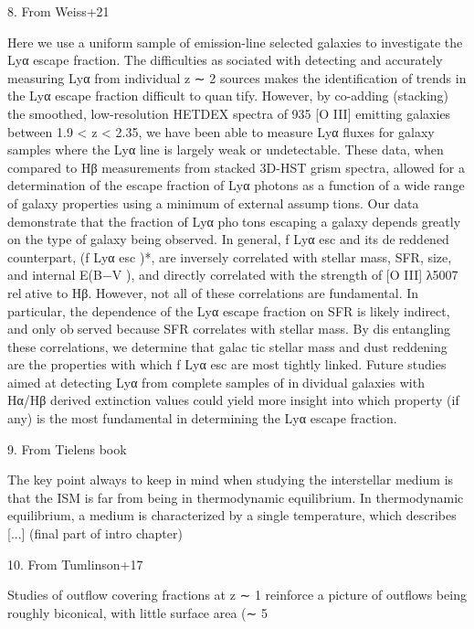 8. From Weiss+21
 
 
Here we use
a uniform sample of emission-line selected galaxies to
investigate the Lyα escape fraction. The difficulties associated with detecting and accurately measuring Lyα
from individual z ∼ 2 sources makes the identification
of trends in the Lyα escape fraction difficult to quantify. However, by co-adding (stacking) the smoothed,
low-resolution HETDEX spectra of 935 [O III] emitting
galaxies between 1.9 < z < 2.35, we have been able to
measure Lyα fluxes for galaxy samples where the Lyα
line is largely weak or undetectable. These data, when
compared to Hβ measurements from stacked 3D-HST
grism spectra, allowed for a determination of the escape
fraction of Lyα photons as a function of a wide range of
galaxy properties using a minimum of external assumptions.
Our data demonstrate that the fraction of Lyα photons escaping a galaxy depends greatly on the type of
galaxy being observed. In general, f
Lyα
esc and its dereddened counterpart, (f
Lyα
esc )*, are inversely correlated
with stellar mass, SFR, size, and internal E(B−V ), and
directly correlated with the strength of [O III] λ5007 relative to Hβ. However, not all of these correlations are
fundamental. In particular, the dependence of the Lyα
escape fraction on SFR is likely indirect, and only observed because SFR correlates with stellar mass. By disentangling these correlations, we determine that galactic stellar mass and dust reddening are the properties
with which f
Lyα
esc are most tightly linked. Future studies
aimed at detecting Lyα from complete samples of individual galaxies with Hα/Hβ derived extinction values
could yield more insight into which property (if any) is
the most fundamental in determining the Lyα escape
fraction.


9. From Tielens book

The key point always to keep in mind when studying the interstellar medium is
that the ISM is far from being in thermodynamic equilibrium. In thermodynamic
equilibrium, a medium is characterized by a single temperature, which describes [...] (final part of  intro chapter) 


10. From Tumlinson+17

Studies of outflow covering
fractions at z ∼ 1 reinforce a picture of outflows being roughly biconical, with little surface
area (∼ 5%